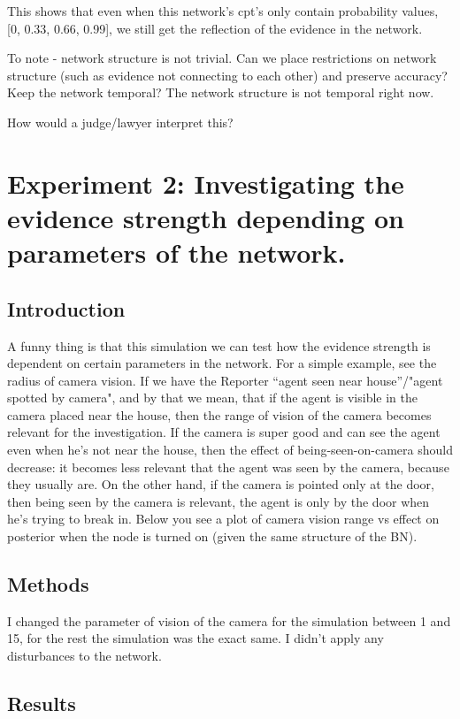 This shows that even when this network's cpt's only contain probability values, [0, 0.33, 0.66, 0.99], we still get the reflection of the evidence in the network. 

To note - network structure is not trivial. Can we place restrictions on network structure (such as evidence not connecting to each other) and preserve accuracy? Keep the network temporal? The network structure is not temporal right now.


How would a judge/lawyer interpret this?





\section{Experiment 2: Investigating the evidence strength depending on parameters of the network.}


\subsection{Introduction}
A funny thing is that this simulation we can test how the evidence strength is dependent on certain parameters in the network. For a simple example, see the radius of camera vision. If we have the Reporter ``agent seen near house''/"agent spotted by camera", and by that we mean, that if the agent is visible in the camera placed near the house, then the range of vision of the camera becomes relevant for the investigation. If the camera is super good and can see the agent even when he's not near the house, then the effect of being-seen-on-camera should decrease: it becomes less relevant that the agent was seen by the camera, because they usually are. On the other hand, if the camera is pointed only at the door, then being seen by the camera is relevant, the agent is only by the door when he's trying to break in. Below you see a plot of camera vision range vs effect on posterior when the node is turned on (given the same structure of the BN).

\subsection{Methods}
I changed the parameter of vision of the camera for the simulation between 1 and 15, for the rest the simulation was the exact same. I didn't apply any disturbances to the network.

\subsection{Results}

